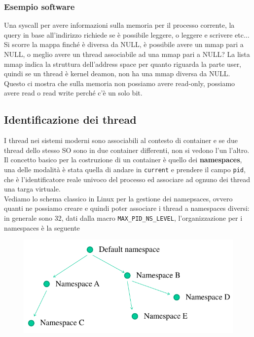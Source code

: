 \documentclass[12pt, oneside]{extbook}
\begin{document}
\subsubsection*{Esempio software}
Una syscall per avere informazioni sulla memoria per il processo corrente, la query in base all'indirizzo richiede se è possibile leggere, o leggere e scrivere etc...\\Si scorre la mappa finché è diversa da NULL, è possibile avere un mmap pari a NULL, o meglio avere un thread associabile ad una mmap pari a NULL? La lista mmap indica la struttura dell'address space per quanto riguarda la parte user, quindi se un thread è kernel deamon, non ha una mmap diversa da NULL. Questo ci mostra che sulla memoria non possiamo avere read-only, possiamo avere read o read write perché c'è un solo bit.
\subsection{Identificazione dei thread}
I thread nei sistemi moderni sono associabili al contesto di container e se due thread dello stesso SO sono in due container differenti, non si vedono l'un l'altro. Il concetto basico per la costruzione di un container è quello dei \textbf{namespaces}, una delle modalità è stata quella di andare in \texttt{current} e prendere il campo \texttt{pid}, che è l'identificatore reale univoco del processo ed associare ad ognuno dei thread una targa virtuale.\\Vediamo lo schema classico in Linux per la gestione dei namepsaces, ovvero quanti ne possiamo creare e quindi poter associare i thread a namespaces diversi: in generale sono 32, dati dalla macro \texttt{MAX\_PID\_NS\_LEVEL}, l'organizzazione per i namespaces è la seguente
\begin{figure}[!h]
	\includegraphics[scale=0.4]{immagini/namespaces.png}
\end{figure}
\end{document}
